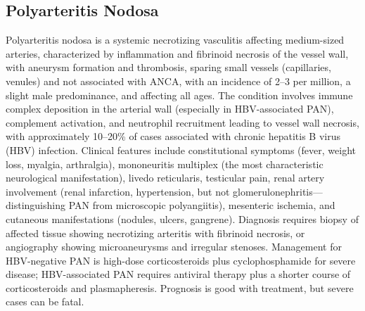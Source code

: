 \subsection{Polyarteritis Nodosa}
\label{sec:Polyarteritis Nodosa}
Polyarteritis nodosa is a systemic necrotizing vasculitis affecting medium-sized arteries, characterized by inflammation and fibrinoid necrosis of the vessel wall, with aneurysm formation and thrombosis, sparing small vessels (capillaries, venules) and not associated with ANCA, with an incidence of 2--3 per million, a slight male predominance, and affecting all ages. The condition involves immune complex deposition in the arterial wall (especially in HBV-associated PAN), complement activation, and neutrophil recruitment leading to vessel wall necrosis, with approximately 10--20\% of cases associated with chronic hepatitis B virus (HBV) infection. Clinical features include constitutional symptoms (fever, weight loss, myalgia, arthralgia), mononeuritis multiplex (the most characteristic neurological manifestation), livedo reticularis, testicular pain, renal artery involvement (renal infarction, hypertension, but not glomerulonephritis---distinguishing PAN from microscopic polyangiitis), mesenteric ischemia, and cutaneous manifestations (nodules, ulcers, gangrene). Diagnosis requires biopsy of affected tissue showing necrotizing arteritis with fibrinoid necrosis, or angiography showing microaneurysms and irregular stenoses. Management for HBV-negative PAN is high-dose corticosteroids plus cyclophosphamide for severe disease; HBV-associated PAN requires antiviral therapy plus a shorter course of corticosteroids and plasmapheresis. Prognosis is good with treatment, but severe cases can be fatal.

